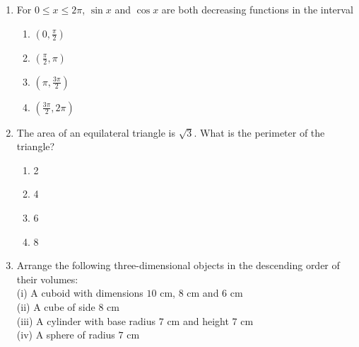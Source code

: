 \documentclass[journal,12pt,onecolumn]{IEEEtran}
\theoremstyle{remark}
\begin{document}
\begin{enumerate}
\begin{multicols}{4}
    
    \begin{enumerate}
        \item rational
        \item reasonable
        \item errant
        \item good
    \end{enumerate}
\end{multicols}
    \item For $0 \leq x \leq 2\pi$, $\sin x$ and $\cos x$ are both decreasing functions in the interval \underline{\hspace{2cm}}
    \begin{multicols}{4}
    \begin{enumerate}
        \item $(0, \frac{\pi}{2})$
        \item $(\frac{\pi}{2}, \pi)$
        \item $(\pi, \frac{3\pi}{2})$
        \item $(\frac{3\pi}{2}, 2\pi)$
    \end{enumerate}
\end{multicols}
    \item The area of an equilateral triangle is $\sqrt{3}$. What is the perimeter of the triangle?
    \begin{multicols}{4}
        
    
    \begin{enumerate}
        \item 2
        \item 4
        \item 6
        \item 8
    \end{enumerate}
\end{multicols}
    \item Arrange the following three-dimensional objects in the descending order of their volumes:\\
    (i) A cuboid with dimensions $10$ cm, $8$ cm and $6$ cm\\
    (ii) A cube of side $8$ cm\\
    (iii) A cylinder with base radius $7$ cm and height $7$ cm\\
    (iv) A sphere of radius $7$ cm


\end{enumerate}
\end{document}
